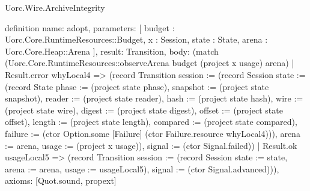 \begin{lexlean}{Uorc.Wire.ArchiveIntegrity}
\begin{semanticmodule}
definition{
  name: adopt,
  parameters: [
    budget : Uorc.Core.RuntimeResources::Budget,
    x : Session,
    state : State,
    arena : Uorc.Core.Heap::Arena
  ],
  result: Transition,
  body: (match (Uorc.Core.RuntimeResources::observeArena budget (project x usage) arena)
    | Result.error whyLocal4 => (record Transition {session := (record Session {state := (record State {phase := (project state phase), snapshot := (project state snapshot), reader := (project state reader), hash := (project state hash), wire := (project state wire), digest := (project state digest), offset := (project state offset), length := (project state length), compared := (project state compared), failure := (ctor Option.some [Failure] (ctor Failure.resource whyLocal4))}), arena := arena, usage := (project x usage)}), signal := (ctor Signal.failed)})
    | Result.ok usageLocal5 => (record Transition {session := (record Session {state := state, arena := arena, usage := usageLocal5}), signal := (ctor Signal.advanced)})),
  axioms: [Quot.sound, propext]
}


\end{semanticmodule}
\end{lexlean}
